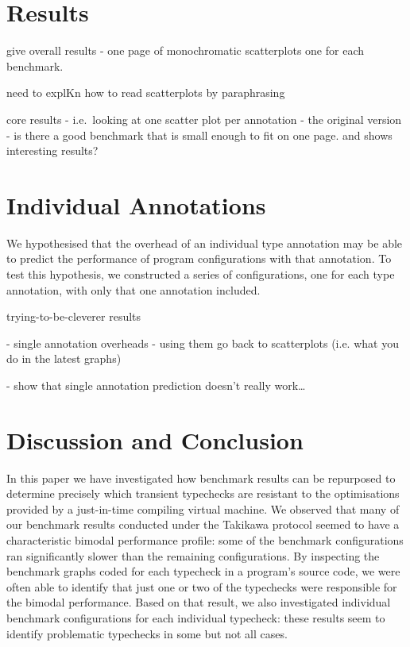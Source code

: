 \documentclass[sigplan,10pt,review,screen]{acmart}\settopmatter{printfolios=true}
\begin{document}
\section{Results}
\label{s-overall}

give overall results - one page of monochromatic scatterplots one for
each benchmark.

need to explKn how to read scatterplots by paraphrasing
\cite{vitousek-transient-arXive-2019}

core results - i.e.\ looking at one scatter plot per annotation - the original version
   - is there a good benchmark that is small enough to fit on one
   page. and shows interesting results?





\section{Individual Annotations}
\label{s-individual}

We hypothesised that the overhead of an individual type annotation may
be able to predict the performance of program configurations with that
annotation. To test this hypothesis, we constructed a series of
configurations, one for each type annotation, with only that
one annotation included.



   trying-to-be-cleverer results

   - single annotation overheads
  - using them go back to scatterplots (i.e. what you do in the latest graphs) 

  - show that single annotation prediction doesn't really work\ldots

\section{Discussion and Conclusion}
\label{s-concl}

In this paper we have investigated how benchmark results can be
repurposed to determine precisely which transient typechecks are
resistant to the optimisations provided by a just-in-time compiling
virtual machine.  We observed that many of our benchmark results
conducted under the Takikawa protocol 
seemed to have a characteristic bimodal performance profile: some
of the benchmark configurations ran significantly slower than
the remaining configurations. By inspecting the benchmark graphs coded
for each typecheck in a program's source code, we were often able to
identify that just one or two of the typechecks were responsible for
the bimodal performance.  Based on that result, we also investigated
individual benchmark configurations for each individual typecheck:
these results seem to identify problematic typechecks in some but not
all cases. 
\end{document}
